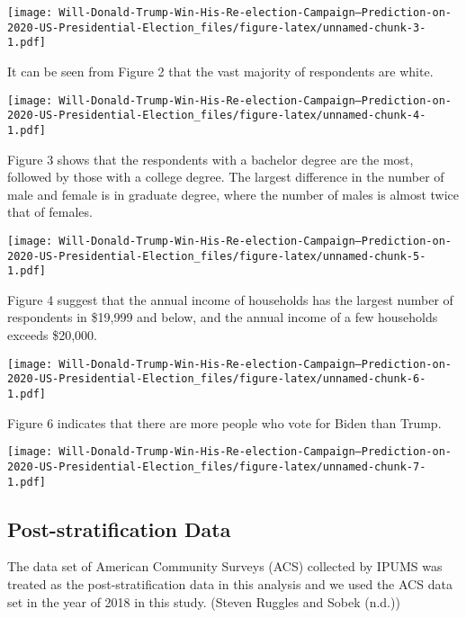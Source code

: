 \documentclass[
]{article}
\begin{document}
\texttt{[image: Will-Donald-Trump-Win-His-Re-election-Campaign--Prediction-on-2020-US-Presidential-Election\_files/figure-latex/unnamed-chunk-3-1.pdf]}

It can be seen from Figure 2 that the vast majority of respondents are
white.

\texttt{[image: Will-Donald-Trump-Win-His-Re-election-Campaign--Prediction-on-2020-US-Presidential-Election\_files/figure-latex/unnamed-chunk-4-1.pdf]}

Figure 3 shows that the respondents with a bachelor degree are the most,
followed by those with a college degree. The largest difference in the
number of male and female is in graduate degree, where the number of
males is almost twice that of females.

\texttt{[image: Will-Donald-Trump-Win-His-Re-election-Campaign--Prediction-on-2020-US-Presidential-Election\_files/figure-latex/unnamed-chunk-5-1.pdf]}

Figure 4 suggest that the annual income of households has the largest
number of respondents in \$19,999 and below, and the annual income of a
few households exceeds \$20,000.

\texttt{[image: Will-Donald-Trump-Win-His-Re-election-Campaign--Prediction-on-2020-US-Presidential-Election\_files/figure-latex/unnamed-chunk-6-1.pdf]}

Figure 6 indicates that there are more people who vote for Biden than
Trump.

\texttt{[image: Will-Donald-Trump-Win-His-Re-election-Campaign--Prediction-on-2020-US-Presidential-Election\_files/figure-latex/unnamed-chunk-7-1.pdf]}

\hypertarget{post-stratification-data}{%
\subsection{Post-stratification Data}\label{post-stratification-data}}

The data set of American Community Surveys (ACS) collected by IPUMS was
treated as the post-stratification data in this analysis and we used the
ACS data set in the year of 2018 in this study. (Steven Ruggles and
Sobek (n.d.))
\end{document}

